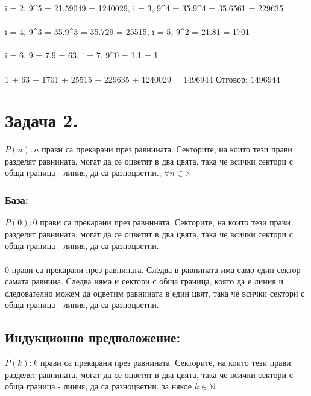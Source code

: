 \documentclass[10pt]{article}
\newcommand{\N}{\mathbb{N}}
\begin{document}
    i = 2, \quad {}9^5 = 21.59049 = 1240029, \quad i = 3, \quad {}9^4 = 35.9^4 = 35.6561 = 229635 \\\\
    i = 4, \quad {}9^3 = 35.9^3 = 35.729 = 25515, \quad  i = 5, \quad {}9^2 = 21.81 = 1701\\\\
    i = 6, \quad {}9 = 7.9 = 63, \quad i = 7, \quad {}9^0 = 1.1 = 1 \\\\
    1 + 63 + 1701 + 25515 + 229635 + 1240029 = 1496944 \)
    Отговор: \(1496944\)
	\section*{Задача 2.}
	\(P(n): n\) прави са прекарани през равнината. Секторите, на които тези прави разделят равнината,
	могат да се оцветят в два цвята, така че всички сектори с обща граница - линия, да са разноцветни.,
	\(\forall n \in \N\)
	\subsubsection*{База:}
	\(P(0): 0\)  прави са прекарани през равнината. Секторите, на които тези прави разделят равнината,
	могат да се оцветят в два цвята, така че всички сектори с обща граница - линия, да са разноцветни. \\\\
	\(0\) прави са прекарани през равнината. Следва в равнината има само един сектор - самата равнина.
	Следва няма и сектори с обща граница, която да е линия и следователно можем да оцветим равнината в един цвят,
	така че всички сектори с обща граница - линия, да са разноцветни. 
	\subsection*{Индукционно предположение:}
	\(P(k): k\) прави са прекарани през равнината. Секторите, на които тези прави разделят равнината,
	могат да се оцветят в два цвята, така че всички сектори с обща граница - линия, да са разноцветни. за някое \(k \in \N\)
\end{document}
